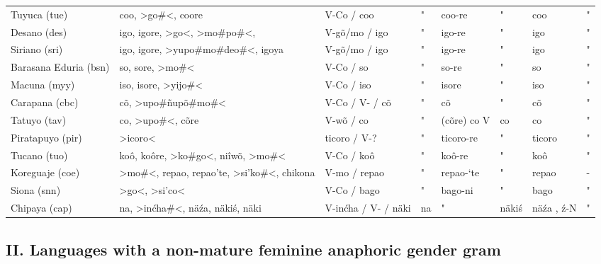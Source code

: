 \begin{landscape}
\begin{longtable}{*{8}{l}}
Tuyuca (tue)	&	coo, >go\#<, coore	&	V-Co / coo	&	"	&	coo-re 	&	"	&	coo	&	"	\\
Desano (des)	&	igo, igore, >go<, >mo\#<, >po\#<, 	&	V-gõ/mo / igo	&	"	&	igo-re 	&	"	&	igo	&	"	\\
Siriano (sri)	&	igo, igore, >yupo\#<, >mo\#<, >deo\#<, {igoya}	&	V-gõ/mo / igo	&	"	&	igo-re 	&	"	&	igo	&	"	\\
Barasana Eduria (bsn)	&	so, sore, >mo\#<	&	V-Co / so	&	"	&	so-re	&	"	&	so	&	"	\\
Macuna (myy)	&	iso, isore, >yijo\#<	&	V-Co / iso	&	"	&	isore 	&	"	&	iso	&	"	\\
Carapana (cbc)	&	cõ, >upo\#<, >ñupõ\#<, >mo\#<	&	V-Co / V- / cõ	&	"	&	cõ	&	"	&	cõ	&	"	\\
Tatuyo (tav)	&	co, >upo\#<, cõre	&	V-wõ / co	&	"	&	(cõre) co V	&	co	&	co	&	"	\\
Piratapuyo (pir)	&	>icoro<	&	ticoro / V-?	&	"	&	ticoro-re	&	"	&	ticoro	&	"	\\
Tucano (tuo)	&	koô, koôre, >ko\#<, >go<, niîwõ, >mo\#<	&	V-Co / koô	&	"	&	koô-re	&	"	&	koô 	&	"	\\
Koreguaje (coe)	&	>mo\#<, repao, repao'te, >si'ko\#<, {chikona}	&	V-mo / repao 	&	"	&	repao-‘te 	&	"	&	repao	&	 -	\\
Siona (snn)	&	>go<, {>si'co<}	&	V-Co / bago	&	"	&	bago-ni	&	"	&	bago 	&	"	\\
Chipaya (cap)	&	na, >inćha\#<, näźa, {näkiś, näki}	&	V-inćha / V- / näki	&	na	&	"	&	näkiś 	&	näźa , ź-N	&	"	\\

\end{longtable}

\end{landscape}



\subsection*{II. Languages with a non-mature feminine anaphoric gender gram \normalfont [59 languages]}

